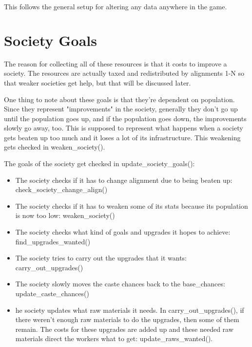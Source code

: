 This follows the general setup for altering any data anywhere in the game.

\section{Society Goals}

The reason for collecting all of these resources is that it costs
to improve a society. The resources are actually taxed and 
redistributed by alignments 1-N so that weaker societies get help,
but that will be discussed later.

One thing to note about these goals is that they're dependent
on population. Since they represent "improvements" in the society,
generally they don't go up until the population goes up, and if
the population goes down, the improvements slowly go away, too.
This is supposed to represent what happens when a society gets
beaten up too much and it loses a lot of its infrastructure.
This weakening gets checked in weaken\_society().

The goals of the society get checked in update\_society\_goals():

\begin{itemize}

\item The society checks if it has to change alignment due to being
beaten up: check\_society\_change\_align()

\item The society checks if it has to weaken some of its stats because
its population is now too low: weaken\_society()

\item The society checks what kind of goals and upgrades it
hopes to achieve: find\_upgrades\_wanted()

\item The society tries to carry out the upgrades that it wants:
carry\_out\_upgrades()

\item The society slowly moves the caste chances back to the base\_chances:
update\_caste\_chances()

\item he society updates what raw materials it needs. In
  carry\_out\_upgrades(), if there weren't enough raw materials to do the
  upgrades, then some of them remain. The costs for these upgrades are added up
  and these needed raw materials direct the workers what to get:
update\_raws\_wanted().

\end{itemize}

